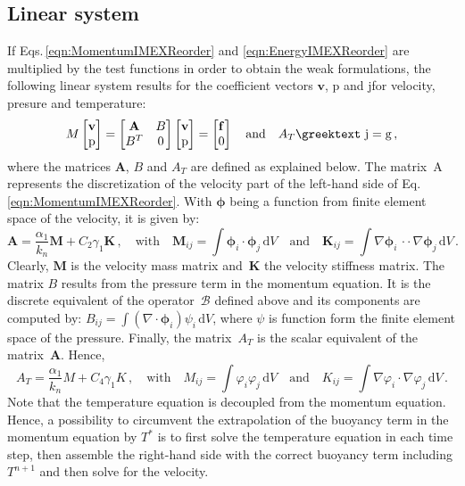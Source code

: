 \documentclass[review]{revtex4-1}
\newcommand{\gtheta}{\textrm{\greektext j}}
\newcommand{\drm}[1]{\ensuremath{\,\mathrm{d}#1}}
\newcommand*{\cdott}{\,{\cdot}{\cdot}\,}
\begin{document}
\subsection{Linear system}
If Eqs.\,\eqref{eqn:MomentumIMEXReorder} and \eqref{eqn:EnergyIMEXReorder} are multiplied by the test functions in order to obtain the weak formulations, the following linear system results for the coefficient vectors $\mathbf{v}$, $\mathrm{p}$ and \gtheta for velocity, presure and temperature:
\begin{equation}
	M\begin{bmatrix} \mathbf{v} \\ \mathrm{p} \end{bmatrix}
	=\begin{bmatrix}
		\mathbf{A} & B\\
		B^T & 0
	\end{bmatrix}
	\begin{bmatrix}	\mathbf{v} \\ \mathrm{p}	\end{bmatrix}
	=\begin{bmatrix} \mathbf{f} \\ 0 \end{bmatrix}\quad\text{and}\quad
	A_T\gtheta=\mathrm{g}\,,
\end{equation}
where the matrices $\mathbf{A}$, $B$ and $A_T$ are defined as explained below. The matrix~$\mathrm{A}$ represents the discretization of the velocity part of the left-hand side of Eq.\,\eqref{eqn:MomentumIMEXReorder}. With $\bm{\phi}$ being a function from finite element space of the velocity, it is given by:
\begin{equation}
	\mathbf{A}=\frac{\alpha_1}{k_n}\mathbf{M}+C_2\gamma_1\mathbf{K}\,,\quad
	\text{with}\quad
	\mathbf{M}_{ij}=\int\bm{\phi}_i\cdot\bm{\phi}_j\drm{V}\quad
	\text{and}\quad
	\mathbf{K}_{ij}=\int\nabla\bm{\phi}_i\cdott\nabla\bm{\phi}_j\drm{V}\,.
\end{equation}
Clearly, $\mathbf{M}$ is the velocity mass matrix and~$\mathbf{K}$ the velocity stiffness matrix. The matrix $B$ results from the pressure term in the momentum equation. It is the discrete equivalent of the operator~$\mathcal{B}$ defined above and its components are computed by: $B_{ij}=\int(\nabla\cdot\bm{\phi}_i)\psi_i\drm{V}$, where $\psi$ is function form the finite element space of the pressure. Finally, the matrix~$A_T$ is the scalar equivalent of the matrix~$\mathbf{A}$. Hence,
\begin{equation}
	A_T=\frac{\alpha_1}{k_n}M+C_4\gamma_1K\,,\quad
	\text{with}\quad
	M_{ij}=\int\varphi_i\varphi_j\drm{V}\quad
	\text{and}\quad
	K_{ij}=\int\nabla\varphi_i\cdot\nabla\varphi_j\drm{V}\,.
\end{equation}
Note that the temperature equation is decoupled from the momentum equation. Hence, a possibility to circumvent the extrapolation of the buoyancy term in the momentum equation by $T^*$ is to first solve the temperature equation in each time step, then assemble the right-hand side with the correct buoyancy term including $T^{n+1}$ and then solve for the velocity.
\end{document}
